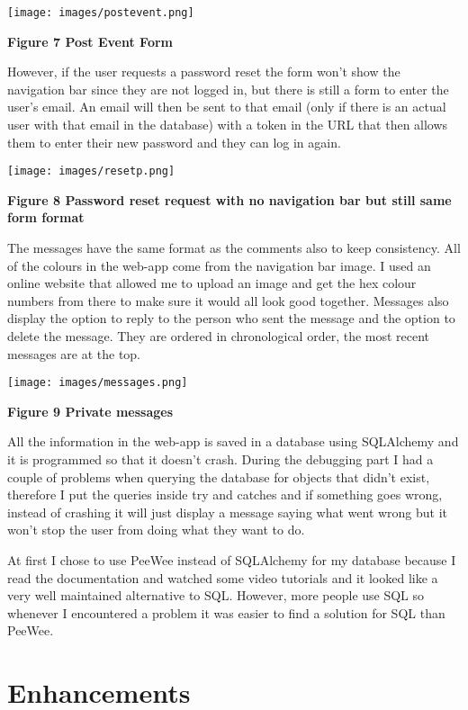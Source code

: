 \documentclass[10pt, a4paper]{article}
\begin{document}
    \texttt{[image: images/postevent.png]}

    \textbf{Figure 7 Post Event Form}
    \vspace{2mm}

However, if the user requests a password reset the form won't show the navigation bar since they are not logged in, but there is still a form to enter the user's email. An email will then be sent to that email (only if there is an actual user with that email in the database) with a token in the URL that then allows them to enter their new password and they can log in again.

    \texttt{[image: images/resetp.png]}

    \textbf{Figure 8 Password reset request with no navigation bar but still same form format}
    \vspace{2mm}

The messages have the same format as the comments also to keep consistency. All of the colours in the web-app come from the navigation bar image. I used an online website that allowed me to upload an image and get the hex colour numbers from there to make sure it would all look good together. Messages also display the option to reply to the person who sent the message and the option to delete the message. They are ordered in chronological order, the most recent messages are at the top.

    \texttt{[image: images/messages.png]}

    \textbf{Figure 9 Private messages}
    \vspace{2mm}

All the information in the web-app is saved in a database using SQLAlchemy and it is programmed so that it doesn't crash. During the debugging part I had a couple of problems when querying the database for objects that didn't exist, therefore I put the queries inside try and catches and if something goes wrong, instead of crashing it will just display a message saying what went wrong but it won't stop the user from doing what they want to do.

At first I chose to use PeeWee instead of SQLAlchemy for my database because I read the documentation and watched some video tutorials and it looked like a very well maintained alternative to SQL. However, more people use SQL so whenever I encountered a problem it was easier to find a solution for SQL than PeeWee.

    \section{Enhancements}
\end{document}
